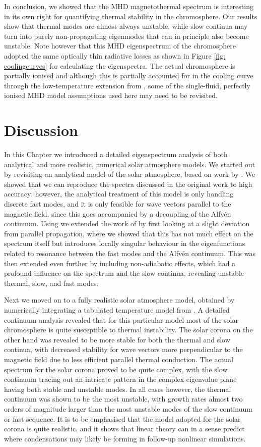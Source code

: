 In conclusion, we showed that the MHD magnetothermal spectrum is interesting in its own right for quantifying thermal stability in the chromosphere. Our results show that thermal modes are almost always unstable, while slow continua may turn into purely non-propagating eigenmodes that can in principle also become unstable. Note however that this MHD eigenspectrum of the chromosphere adopted the same optically thin radiative losses as shown in Figure \ref{fig: coolingcurves} for calculating the eigenspectra. The actual chromosphere is partially ionised and although this is partially accounted for in the cooling curve through the low-temperature extension from \citet{dalgarno1972}, some of the single-fluid, perfectly ionised MHD model assumptions used here may need to be revisited.

\section{Discussion}
In this Chapter we introduced a detailed eigenspectrum analysis of both analytical and more realistic, numerical solar atmosphere models. We started out by revisiting an analytical model of the solar atmosphere, based on work by \citet{nye1976}. We showed that we can reproduce the spectra discussed in the original work to high accuracy; however, the analytical treatment of this model is only handling discrete fast modes, and it is only feasible for wave vectors parallel to the magnetic field, since this goes accompanied by a decoupling of the Alfv\'en continuum. Using {\legolas} we extended the work of \citet{nye1976} by first looking at a slight deviation from parallel propagation, where we showed that this has not much effect on the spectrum itself but introduces locally singular behaviour in the eigenfunctions related to resonance between the fast modes and the Alfv\'en continuum. This was then extended even further by including non-adiabatic effects, which had a profound influence on the spectrum and the slow continua, revealing unstable thermal, slow, and fast modes.

Next we moved on to a fully realistic solar atmosphere model, obtained by numerically integrating a tabulated temperature model from \citet{avrett2008}. A detailed continuum analysis revealed that for this particular model most of the solar chromosphere is quite susceptible to thermal instability. The solar corona on the other hand was revealed to be more stable for both the thermal and slow continua, with decreased stability for wave vectors more perpendicular to the magnetic field due to less efficient parallel thermal conduction. The actual spectrum for the solar corona proved to be quite complex, with the slow continuum tracing out an intricate pattern in the complex eigenvalue plane having both stable and unstable modes. In all cases however, the thermal continuum was shown to be the most unstable, with growth rates almost two orders of magnitude larger than the most unstable modes of the slow continuum or fast sequence. It is to be emphasised that the model adopted for the solar corona is quite realistic, and it shows that linear theory can in a sense predict where condensations may likely be forming in follow-up nonlinear simulations.

